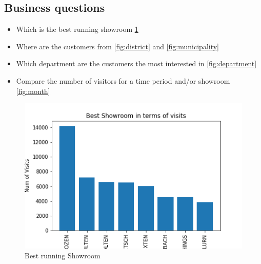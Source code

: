 \documentclass[letterpaper,12pt]{article}
\begin{document}
\subsection{Business questions}

\begin{itemize}
        \item Which is the best running showroom \ref{fig:best_showroom}
        \item Where are the customers from \ref{fig:district} and \ref{fig:municipality}
        \item Which department are the customers the most interested in \ref{fig:department}
        \item Compare the number of visitors for a time period and/or showroom \ref{fig:month}
\end{itemize}

\begin{figure}[H] 
        \centering
        \includegraphics[width=\columnwidth]{../images/best_showroom.png}
        \caption{
                \label{fig:best_showroom}  
                Best running Showroom
        }
\end{figure}
\end{document}

